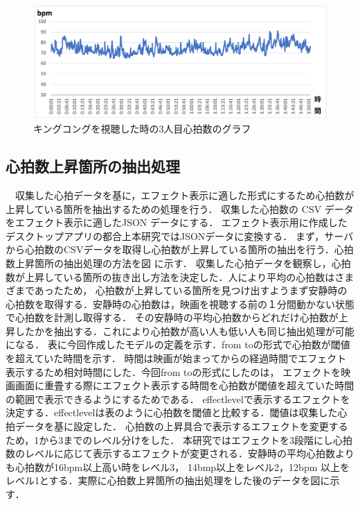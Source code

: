 \begin{figure}[H]
    \centering
    \includegraphics[width=16cm]{images/chapter3/gurafu1.png}
    \caption{キングコングを視聴した時の3人目心拍数のグラフ}
\end{figure}

\subsection{心拍数上昇箇所の抽出処理}
　収集した心拍データを基に，エフェクト表示に適した形式にするため心拍数が上昇している箇所を抽出するための処理を行う．
収集した心拍数の CSV データをエフェクト表示に適したJSON データにする．
エフェクト表示用に作成したデスクトップアプリの都合上本研究ではJSONデータに変換する．
まず，サーバから心拍数のCSVデータを取得し心拍数が上昇している箇所の抽出を行う．心拍数上昇箇所の抽出処理の方法を図 に示す．
収集した心拍データを観察し，心拍数が上昇している箇所の抜き出し方法を決定した．人により平均の心拍数はさまざまであったため，
心拍数が上昇している箇所を見つけ出すようまず安静時の心拍数を取得する．安静時の心拍数は，映画を視聴する前の１分間動かない状態で心拍数を計測し取得する．
その安静時の平均心拍数からどれだけ心拍数が上昇したかを抽出する．これにより心拍数が高い人も低い人も同じ抽出処理が可能になる．
表に今回作成したモデルの定義を示す．from toの形式で心拍数が閾値を超えていた時間を示す．
時間は映画が始まってからの経過時間でエフェクト表示するため相対時間にした．今回from toの形式にしたのは，
エフェクトを映画画面に重畳する際にエフェクト表示する時間を心拍数が閾値を超えていた時間の範囲で表示できるようにするためである．
effectlevelで表示するエフェクトを決定する．effectlevelは表のように心拍数を閾値と比較する．閾値は収集した心拍データを基に設定した．
心拍数の上昇具合で表示するエフェクトを変更するため，1から3までのレベル分けをした．
本研究ではエフェクトを3段階にし心拍数のレベルに応じて表示するエフェクトが変更される．安静時の平均心拍数よりも心拍数が16bpm以上高い時をレベル3，
14bmp以上をレベル2，12bpm 以上をレベル1とする．実際に心拍数上昇箇所の抽出処理をした後のデータを図に示す．


